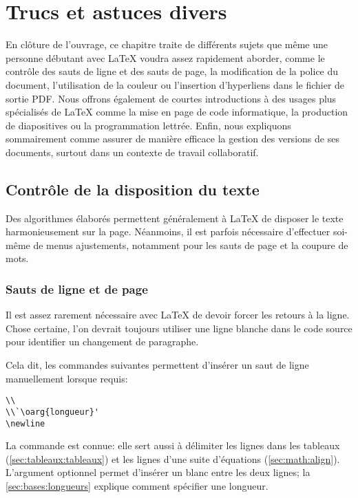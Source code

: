 \chapter{Trucs et astuces divers}
\label{chap:trucs}

En clôture de l'ouvrage, ce chapitre traite de différents sujets que
même une personne débutant avec {\LaTeX} voudra assez rapidement
aborder, comme le contrôle des sauts de ligne et des sauts de page, la
modification de la police du document, l'utilisation de la couleur ou
l'insertion d'hyperliens dans le fichier de sortie PDF. Nous offrons
également de courtes introductions à des usages plus spécialisés de
{\LaTeX} comme la mise en page de code informatique, la production de
diapositives ou la programmation lettrée. Enfin, nous expliquons
sommairement comme assurer de manière efficace la gestion des versions
de ses documents, surtout dans un contexte de travail collaboratif.

\section{Contrôle de la disposition du texte}
\label{sec:trucs:controle}

Des algorithmes élaborés permettent généralement à {\LaTeX} de
disposer le texte harmonieusement sur la page. Néanmoins, il
est parfois nécessaire  d'effectuer soi-même de menus ajustements,
notamment pour les sauts de page et la coupure de mots.

\subsection{Sauts de ligne et de page}
\label{sec:trucs:controle:sauts}

Il est assez rarement nécessaire avec {\LaTeX} de devoir forcer les
retours à la ligne. Chose certaine, l'on devrait toujours utiliser une
ligne blanche dans le code source pour identifier un changement de
paragraphe.

Cela dit, les commandes suivantes permettent d'insérer un saut de
ligne manuellement lorsque requis:
\begin{lstlisting}
\\
\\`\oarg{longueur}'
\newline
\end{lstlisting}
La commande {\pixbsbs} est connue: elle sert aussi à délimiter les
lignes dans les tableaux (\autoref{sec:tableaux:tableaux}) et les lignes
d'une suite d'équations (\autoref{sec:math:align}). L'argument optionnel
 permet d'insérer un blanc entre les deux lignes; la
\autoref{sec:bases:longueurs} explique comment spécifier une
longueur.

